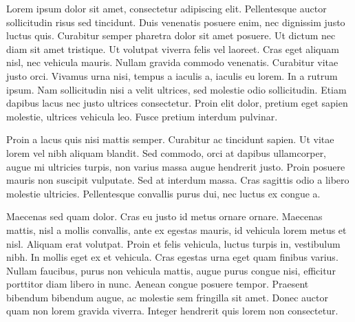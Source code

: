  Lorem ipsum dolor sit amet, consectetur adipiscing elit. Pellentesque auctor sollicitudin risus sed tincidunt. Duis venenatis posuere enim, nec dignissim justo luctus quis. Curabitur semper pharetra dolor sit amet posuere. Ut dictum nec diam sit amet tristique. Ut volutpat viverra felis vel laoreet. Cras eget aliquam nisl, nec vehicula mauris. Nullam gravida commodo venenatis. Curabitur vitae justo orci. Vivamus urna nisi, tempus a iaculis a, iaculis eu lorem. In a rutrum ipsum. Nam sollicitudin nisi a velit ultrices, sed molestie odio sollicitudin. Etiam dapibus lacus nec justo ultrices consectetur. Proin elit dolor, pretium eget sapien molestie, ultrices vehicula leo. Fusce pretium interdum pulvinar.

Proin a lacus quis nisi mattis semper. Curabitur ac tincidunt sapien. Ut vitae lorem vel nibh aliquam blandit. Sed commodo, orci at dapibus ullamcorper, augue mi ultricies turpis, non varius massa augue hendrerit justo. Proin posuere mauris non suscipit vulputate. Sed at interdum massa. Cras sagittis odio a libero molestie ultricies. Pellentesque convallis purus dui, nec luctus ex congue a.

Maecenas sed quam dolor. Cras eu justo id metus ornare ornare. Maecenas mattis, nisl a mollis convallis, ante ex egestas mauris, id vehicula lorem metus et nisl. Aliquam erat volutpat. Proin et felis vehicula, luctus turpis in, vestibulum nibh. In mollis eget ex et vehicula. Cras egestas urna eget quam finibus varius. Nullam faucibus, purus non vehicula mattis, augue purus congue nisi, efficitur porttitor diam libero in nunc. Aenean congue posuere tempor. Praesent bibendum bibendum augue, ac molestie sem fringilla sit amet. Donec auctor quam non lorem gravida viverra. Integer hendrerit quis lorem non consectetur. 